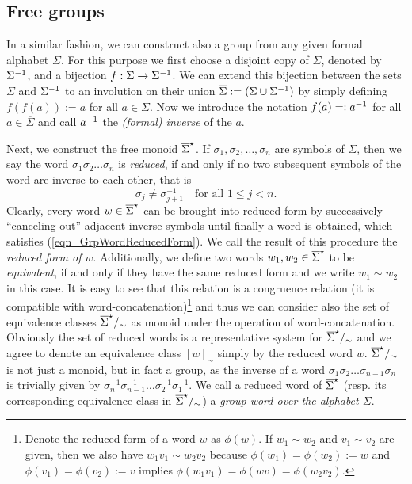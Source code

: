\subsection{Free groups}
In a similar fashion, we can construct also a group from any given formal alphabet $\Sigma$. For this purpose we first choose a disjoint copy of $\Sigma$, denoted by ${\Sigma}^{-1}$, and a bijection $f : \Sigma \to {\Sigma}^{-1}$. We can extend this bijection between the sets $\Sigma$ and ${\Sigma}^{-1}$ to an involution on their union $\overline{\Sigma} := (\Sigma \cup {\Sigma}^{-1})$ by simply defining $f(f(a)) := a$ for all $a \in \Sigma$. Now we introduce the notation $f(a) =: {a}^{-1}$ for all $a \in \overline{\Sigma}$ and call ${a}^{-1}$ the \emph{(formal) inverse} of the $a$.

Next, we construct the free monoid ${\overline{\Sigma}}^{\star}$. If $\sigma_1, \sigma_2, \dots, \sigma_n$ are symbols of $\overline{\Sigma}$, then we say the word $\sigma_1 \sigma_2 \dots \sigma_n$ is \emph{reduced}, if and only if no two subsequent symbols of the word are inverse to each other, that is
\begin{equation}
\label{eqn_GrpWordReducedForm}
 \sigma_j \ne \sigma_{j+1}^{-1} \quad \text{for all } 1 \le j < n.
\end{equation}
Clearly, every word $w \in {\overline{\Sigma}}^{\star}$ can be brought into reduced form by successively ``canceling out'' adjacent inverse symbols until finally a word is obtained, which satisfies (\ref{eqn_GrpWordReducedForm}). We call the result of this procedure the \emph{reduced form of $w$}. Additionally, we define two words $w_1, w_2 \in {\overline{\Sigma}}^{\star}$ to be \emph{equivalent}, if and only if they have the same reduced form and we write $w_1 \sim w_2$ in this case. It is easy to see that this relation is a congruence relation (\ie it is compatible with word-concatenation)\footnote{Denote the reduced form of a word $w$ as $\phi(w)$. If $w_1 \sim w_2$ and $v_1 \sim v_2$ are given, then we also have $w_1 v_1 \sim w_2 v_2$ because $\phi(w_1) = \phi(w_2) := w$ and $\phi(v_1) = \phi(v_2) := v$ implies $\phi(w_1 v_1) = \phi(w v) = \phi(w_2 v_2)$.} and thus we can consider also the set of equivalence classes ${\overline{\Sigma}}^{\star}/_{\sim}$ as monoid under the operation of word-concatenation. Obviously the set of reduced words is a representative system for ${\overline{\Sigma}}^{\star}/_{\sim}$ and we agree to denote an equivalence class $[w]_{\sim}$ simply by the reduced word $w$. ${\overline{\Sigma}}^{\star}/_{\sim}$ is not just a monoid, but in fact a group, as the inverse of a word $\sigma_1 \sigma_2 \dots \sigma_{n-1} \sigma_n$ is trivially given by $\sigma_n^{-1} \sigma_{n-1}^{-1} \dots \sigma_2^{-1} \sigma_1^{-1}$. We call a reduced word of ${\overline{\Sigma}}^{\star}$ (resp. its corresponding equivalence class in ${\overline{\Sigma}}^{\star}/_{\sim}$) a \emph{group word over the alphabet $\Sigma$}.

